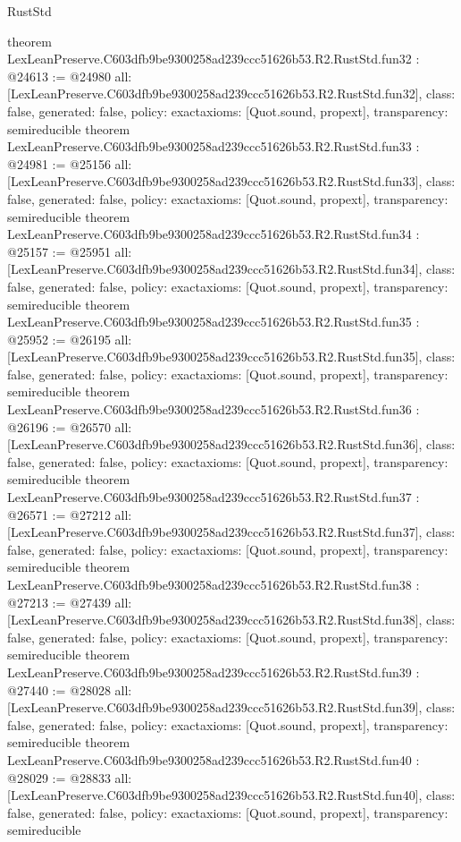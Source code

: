 \begin{lexlean}{RustStd}
\begin{coremodule}
{}
theorem LexLeanPreserve.C603dfb9be9300258ad239ccc51626b53.R2.RustStd.fun32 : @24613 := @24980 {
  all: [LexLeanPreserve.C603dfb9be9300258ad239ccc51626b53.R2.RustStd.fun32],
  class: false,
  generated: false,
  policy: exact{axioms: [Quot.sound, propext]},
  transparency: semireducible
}
theorem LexLeanPreserve.C603dfb9be9300258ad239ccc51626b53.R2.RustStd.fun33 : @24981 := @25156 {
  all: [LexLeanPreserve.C603dfb9be9300258ad239ccc51626b53.R2.RustStd.fun33],
  class: false,
  generated: false,
  policy: exact{axioms: [Quot.sound, propext]},
  transparency: semireducible
}
theorem LexLeanPreserve.C603dfb9be9300258ad239ccc51626b53.R2.RustStd.fun34 : @25157 := @25951 {
  all: [LexLeanPreserve.C603dfb9be9300258ad239ccc51626b53.R2.RustStd.fun34],
  class: false,
  generated: false,
  policy: exact{axioms: [Quot.sound, propext]},
  transparency: semireducible
}
theorem LexLeanPreserve.C603dfb9be9300258ad239ccc51626b53.R2.RustStd.fun35 : @25952 := @26195 {
  all: [LexLeanPreserve.C603dfb9be9300258ad239ccc51626b53.R2.RustStd.fun35],
  class: false,
  generated: false,
  policy: exact{axioms: [Quot.sound, propext]},
  transparency: semireducible
}
theorem LexLeanPreserve.C603dfb9be9300258ad239ccc51626b53.R2.RustStd.fun36 : @26196 := @26570 {
  all: [LexLeanPreserve.C603dfb9be9300258ad239ccc51626b53.R2.RustStd.fun36],
  class: false,
  generated: false,
  policy: exact{axioms: [Quot.sound, propext]},
  transparency: semireducible
}
theorem LexLeanPreserve.C603dfb9be9300258ad239ccc51626b53.R2.RustStd.fun37 : @26571 := @27212 {
  all: [LexLeanPreserve.C603dfb9be9300258ad239ccc51626b53.R2.RustStd.fun37],
  class: false,
  generated: false,
  policy: exact{axioms: [Quot.sound, propext]},
  transparency: semireducible
}
theorem LexLeanPreserve.C603dfb9be9300258ad239ccc51626b53.R2.RustStd.fun38 : @27213 := @27439 {
  all: [LexLeanPreserve.C603dfb9be9300258ad239ccc51626b53.R2.RustStd.fun38],
  class: false,
  generated: false,
  policy: exact{axioms: [Quot.sound, propext]},
  transparency: semireducible
}
theorem LexLeanPreserve.C603dfb9be9300258ad239ccc51626b53.R2.RustStd.fun39 : @27440 := @28028 {
  all: [LexLeanPreserve.C603dfb9be9300258ad239ccc51626b53.R2.RustStd.fun39],
  class: false,
  generated: false,
  policy: exact{axioms: [Quot.sound, propext]},
  transparency: semireducible
}
theorem LexLeanPreserve.C603dfb9be9300258ad239ccc51626b53.R2.RustStd.fun40 : @28029 := @28833 {
  all: [LexLeanPreserve.C603dfb9be9300258ad239ccc51626b53.R2.RustStd.fun40],
  class: false,
  generated: false,
  policy: exact{axioms: [Quot.sound, propext]},
  transparency: semireducible
}
\end{coremodule}
\end{lexlean}
